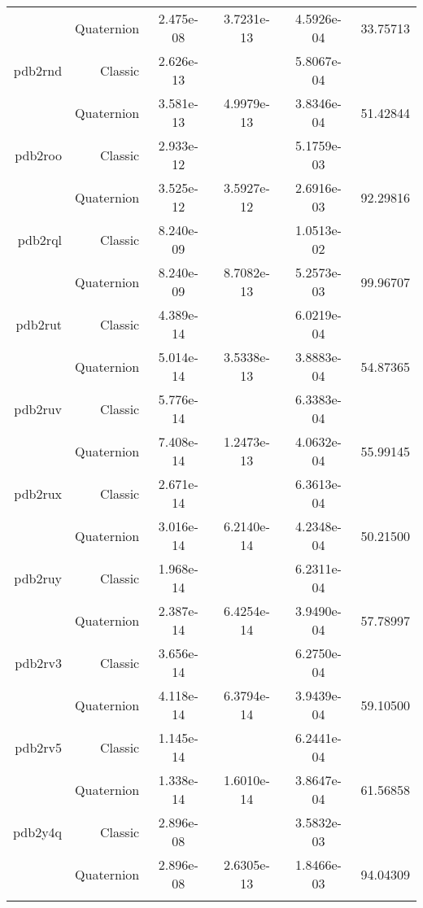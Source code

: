 \begin{xltabular}{\textwidth}{r|rS[table-format=1.3e+2]S[table-format=1.4e+2]S[table-format=1.4e+2]S[table-format=-1.5]}
& Quaternion & 2.475e-08 & 3.7231e-13 & 4.5926e-04 & 33.75713\\  \addlinespace
pdb2rnd & Classic & 2.626e-13 &  & 5.8067e-04 & \\
& Quaternion & 3.581e-13 & 4.9979e-13 & 3.8346e-04 & 51.42844\\  \addlinespace
pdb2roo & Classic & 2.933e-12 &  & 5.1759e-03 & \\
& Quaternion & 3.525e-12 & 3.5927e-12 & 2.6916e-03 & 92.29816\\  \addlinespace
pdb2rql & Classic & 8.240e-09 &  & 1.0513e-02 & \\
& Quaternion & 8.240e-09 & 8.7082e-13 & 5.2573e-03 & 99.96707\\  \addlinespace
pdb2rut & Classic & 4.389e-14 &  & 6.0219e-04 & \\
& Quaternion & 5.014e-14 & 3.5338e-13 & 3.8883e-04 & 54.87365\\  \addlinespace
pdb2ruv & Classic & 5.776e-14 &  & 6.3383e-04 & \\
& Quaternion & 7.408e-14 & 1.2473e-13 & 4.0632e-04 & 55.99145\\  \addlinespace
pdb2rux & Classic & 2.671e-14 &  & 6.3613e-04 & \\
& Quaternion & 3.016e-14 & 6.2140e-14 & 4.2348e-04 & 50.21500\\  \addlinespace
pdb2ruy & Classic & 1.968e-14 &  & 6.2311e-04 & \\
& Quaternion & 2.387e-14 & 6.4254e-14 & 3.9490e-04 & 57.78997\\  \addlinespace
pdb2rv3 & Classic & 3.656e-14 &  & 6.2750e-04 & \\
& Quaternion & 4.118e-14 & 6.3794e-14 & 3.9439e-04 & 59.10500\\  \addlinespace
pdb2rv5 & Classic & 1.145e-14 &  & 6.2441e-04 & \\
& Quaternion & 1.338e-14 & 1.6010e-14 & 3.8647e-04 & 61.56858\\  \addlinespace
pdb2y4q & Classic & 2.896e-08 &  & 3.5832e-03 & \\
& Quaternion & 2.896e-08 & 2.6305e-13 & 1.8466e-03 & 94.04309\\  \addlinespace
\end{xltabular}
